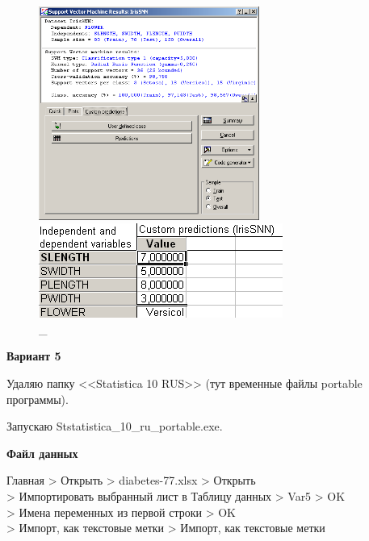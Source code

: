 \begin{figure}[!h]
  \centering

  \begin{minipage}{0.49\textwidth}
    \centering

    \includegraphics[height=7cm]
    {inc/ex_23.PNG}

    \caption{\_}

    \label{fig:23}
  \end{minipage}
  \begin{minipage}{0.49\textwidth}
    \centering

    \includegraphics[width=8cm]
    {inc/ex_24.PNG}

    \caption{\_}

    \label{fig:24}
  \end{minipage}
\end{figure}

\newpage

\begin{center}
  \textbf{Вариант 5}
\end{center}

Удаляю папку <<Statistica 10 RUS>> (тут временные файлы portable программы).

Запускаю Ststatistica\_10\_ru\_portable.exe.

\begin{center}
  \textbf{Файл данных}
\end{center}

Главная > Открыть > diabetes-77.xlsx > Открыть \\
> Импортировать выбранный лист в Таблицу данных > Var5 > OK \\
> Имена переменных из первой строки > OK \\
> Импорт, как текстовые метки > Импорт, как текстовые метки

